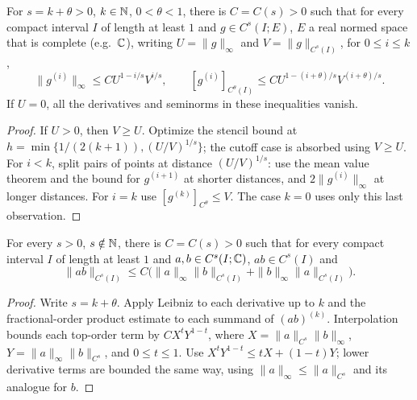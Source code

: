 \begin{lemma}
  \label{lem:c03_holder_interpolation}
  For $s=k+\theta>0$, $k\in\mathbb{N}$, $0<\theta<1$, there is $C=C(s)>0$ such that
  for every compact interval $I$ of length at least $1$ and $g\in C^s(I;E)$, $E$ a real normed space
  that is complete (e.g.\ $\mathbb{C}$), writing $U=\|g\|_\infty$ and $V=\|g\|_{C^s(I)}$, for $0\le i\le k$,
  \[
    \|g^{(i)}\|_\infty\le C U^{1-i/s}V^{i/s},\qquad
    [g^{(i)}]_{C^\theta(I)}\le C U^{1-(i+\theta)/s}V^{(i+\theta)/s}.
  \]
  If $U=0$, all the derivatives and seminorms in these inequalities vanish.
\end{lemma}
\begin{proof}
  If $U>0$, then $V\ge U$. Optimize the stencil bound at
  $h=\min\{1/(2(k+1)),(U/V)^{1/s}\}$; the cutoff case is absorbed using $V\ge U$.
  For $i<k$, split pairs of points at distance $(U/V)^{1/s}$: use the mean value theorem
  and the bound for $g^{(i+1)}$ at shorter distances, and $2\|g^{(i)}\|_\infty$ at longer distances.
  For $i=k$ use $[g^{(k)}]_{C^\theta}\le V$. The case $k=0$ uses only this last observation.
\end{proof}

\begin{lemma}
  \label{lem:c03_holder_product_tame}
  For every $s>0$, $s\notin\mathbb{N}$, there is $C=C(s)>0$ such that for every compact interval
  $I$ of length at least $1$ and $a,b\in C^s(I;\mathbb{C})$, $ab\in C^s(I)$ and
  \[
    \|ab\|_{C^s(I)}\le C\bigl(\|a\|_\infty\|b\|_{C^s(I)}+
                                      \|b\|_\infty\|a\|_{C^s(I)}\bigr).
  \]
\end{lemma}
\begin{proof}
  Write $s=k+\theta$. Apply Leibniz to each derivative up to $k$ and the fractional-order
  product estimate to each summand of $(ab)^{(k)}$. Interpolation bounds each top-order term by
  $C X^tY^{1-t}$, where $X=\|a\|_{C^s}\|b\|_\infty$, $Y=\|a\|_\infty\|b\|_{C^s}$,
  and $0\le t\le1$. Use $X^tY^{1-t}\le tX+(1-t)Y$; lower derivative terms are bounded the
  same way, using $\|a\|_\infty\le\|a\|_{C^s}$ and its analogue for $b$.
\end{proof}

